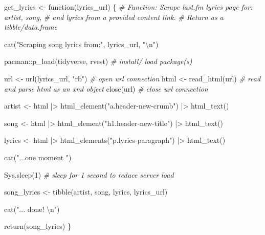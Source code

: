\documentclass[
  letterpaper,
]{latex/krantz}
\newenvironment{Shaded}{\begin{snugshade}}{\end{snugshade}}
\newcommand{\CommentTok}[1]{\textcolor[rgb]{0.00,0.00,0.00}{\textit{#1}}}
\newcommand{\ControlFlowTok}[1]{\textcolor[rgb]{0.00,0.00,0.00}{#1}}
\newcommand{\DecValTok}[1]{\textcolor[rgb]{0.00,0.00,0.00}{#1}}
\newcommand{\FunctionTok}[1]{\textcolor[rgb]{0.00,0.00,0.00}{#1}}
\newcommand{\NormalTok}[1]{\textcolor[rgb]{0.00,0.00,0.00}{#1}}
\newcommand{\OtherTok}[1]{\textcolor[rgb]{0.00,0.00,0.00}{#1}}
\newcommand{\SpecialCharTok}[1]{\textcolor[rgb]{0.00,0.00,0.00}{#1}}
\newcommand{\StringTok}[1]{\textcolor[rgb]{0.00,0.00,0.00}{#1}}
\begin{document}
\begin{Shaded}
\begin{Highlighting}[]
\NormalTok{get\_lyrics }\OtherTok{\textless{}{-}} \ControlFlowTok{function}\NormalTok{(lyrics\_url) \{}
  \CommentTok{\# Function: Scrape last.fm lyrics page for: artist, song, }
  \CommentTok{\# and lyrics from a provided content link. }
  \CommentTok{\# Return as a tibble/data.frame}
  
  \FunctionTok{cat}\NormalTok{(}\StringTok{"Scraping song lyrics from:"}\NormalTok{, lyrics\_url, }\StringTok{"}\SpecialCharTok{\textbackslash{}n}\StringTok{"}\NormalTok{)}
  
\NormalTok{  pacman}\SpecialCharTok{::}\FunctionTok{p\_load}\NormalTok{(tidyverse, rvest) }\CommentTok{\# install/ load package(s)}
  
\NormalTok{  url }\OtherTok{\textless{}{-}} \FunctionTok{url}\NormalTok{(lyrics\_url, }\StringTok{"rb"}\NormalTok{) }\CommentTok{\# open url connection }
\NormalTok{  html }\OtherTok{\textless{}{-}} \FunctionTok{read\_html}\NormalTok{(url) }\CommentTok{\# read and parse html as an xml object}
  \FunctionTok{close}\NormalTok{(url) }\CommentTok{\# close url connection}
  
\NormalTok{  artist }\OtherTok{\textless{}{-}} 
\NormalTok{    html }\SpecialCharTok{|\textgreater{}} 
    \FunctionTok{html\_element}\NormalTok{(}\StringTok{"a.header{-}new{-}crumb"}\NormalTok{) }\SpecialCharTok{|\textgreater{}} 
    \FunctionTok{html\_text}\NormalTok{()}
  
\NormalTok{  song }\OtherTok{\textless{}{-}} 
\NormalTok{    html }\SpecialCharTok{|\textgreater{}} 
    \FunctionTok{html\_element}\NormalTok{(}\StringTok{"h1.header{-}new{-}title"}\NormalTok{) }\SpecialCharTok{|\textgreater{}} 
    \FunctionTok{html\_text}\NormalTok{()}
  
\NormalTok{  lyrics }\OtherTok{\textless{}{-}} 
\NormalTok{    html }\SpecialCharTok{|\textgreater{}} 
    \FunctionTok{html\_elements}\NormalTok{(}\StringTok{"p.lyrics{-}paragraph"}\NormalTok{) }\SpecialCharTok{|\textgreater{}} 
    \FunctionTok{html\_text}\NormalTok{()}
  
  \FunctionTok{cat}\NormalTok{(}\StringTok{"...one moment "}\NormalTok{)}
  
  \FunctionTok{Sys.sleep}\NormalTok{(}\DecValTok{1}\NormalTok{) }\CommentTok{\# sleep for 1 second to reduce server load}
  
\NormalTok{  song\_lyrics }\OtherTok{\textless{}{-}} \FunctionTok{tibble}\NormalTok{(artist, song, lyrics, lyrics\_url)}
  
  \FunctionTok{cat}\NormalTok{(}\StringTok{"... done! }\SpecialCharTok{\textbackslash{}n}\StringTok{"}\NormalTok{)}
  
  \FunctionTok{return}\NormalTok{(song\_lyrics)}
\NormalTok{\}}
\end{Highlighting}
\end{Shaded}
\end{document}
